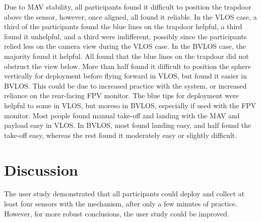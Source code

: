 Due to \gls{MAV} stability, all participants found it difficult to position the trapdoor above the sensor, however, once aligned, all found it reliable. In the \gls{VLOS} case, a third of the participants found the blue lines on the trapdoor helpful, a third found it unhelpful, and a third were indifferent, possibly since the participants relied less on the camera view during the \gls{VLOS} case. In the \gls{BVLOS} case, the majority found it helpful. All found that the blue lines on the trapdoor did not obstruct the view below.
More than half found it difficult to position the sphere vertically for deployment before flying forward in \gls{VLOS}, but found it easier in \gls{BVLOS}. This could be due to increased practice with the system, or increased reliance on the rear-facing \gls{FPV} monitor.
The blue tips for deployment were helpful to some in \gls{VLOS}, but moreso in \gls{BVLOS}, especially if used with the \gls{FPV} monitor.
Most people found manual take-off and landing with the \gls{MAV} and payload easy in \gls{VLOS}. In \gls{BVLOS}, most found landing easy, and half found the take-off easy, whereas the rest found it moderately easy or slightly difficult.




\section{Discussion}

The user study demonstrated that all participants could deploy and collect at least four sensors with the mechanism, after only a few minutes of practice. However, for more robust conclusions, the user study could be improved.

